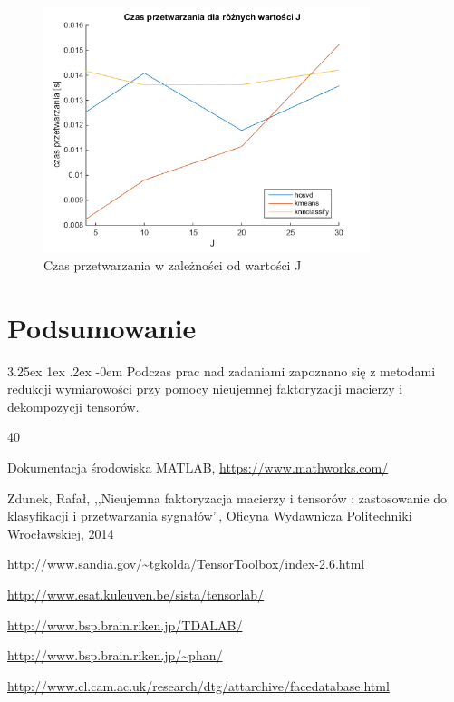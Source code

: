\documentclass[11pt, a4paper]{article}
\makeatletter
\renewcommand\paragraph{\@startsection{paragraph}{5}{\z@}
  {3.25ex \@plus1ex \@minus.2ex}
  {-0em}
  {\normalfont\normalsize\bfseries}}
\makeatother
\begin{document}
\begin{figure}[H]
	\centering
	\includegraphics[width=0.85\textwidth]{./assets/wykres_zad3_czas.png}
	\caption{Czas przetwarzania w zależności od wartości J}
	\label{fig:wykres_zad3_czas}
\end{figure}


\section{Podsumowanie}
\paragraph{}
Podczas prac nad zadaniami zapoznano się z metodami redukcji wymiarowości przy pomocy nieujemnej faktoryzacji macierzy i dekompozycji tensorów.


\newpage
\begin{thebibliography}{40}

Dokumentacja środowiska MATLAB,
\url{https://www.mathworks.com/}

Zdunek, Rafał, ,,Nieujemna faktoryzacja macierzy i tensorów : zastosowanie do klasyfikacji i przetwarzania sygnałów'', Oficyna Wydawnicza Politechniki Wrocławskiej, 2014

\url{http://www.sandia.gov/~tgkolda/TensorToolbox/index-2.6.html}

\url{http://www.esat.kuleuven.be/sista/tensorlab/}

\url{http://www.bsp.brain.riken.jp/TDALAB/}

\url{http://www.bsp.brain.riken.jp/~phan/}

\url{http://www.cl.cam.ac.uk/research/dtg/attarchive/facedatabase.html}

\end{thebibliography}
\end{document}

